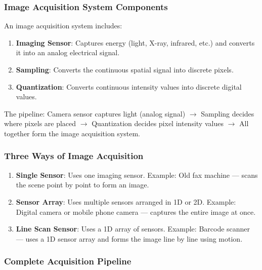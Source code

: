 \documentclass[11pt,a4paper]{article}
\begin{document}
\subsubsection{Image Acquisition System Components}

An image acquisition system includes:
\begin{enumerate}
    \item \textbf{Imaging Sensor}: Captures energy (light, X-ray, infrared, etc.) and converts it into an analog electrical signal.
    \item \textbf{Sampling}: Converts the continuous spatial signal into discrete pixels.
    \item \textbf{Quantization}: Converts continuous intensity values into discrete digital values.
\end{enumerate}

The pipeline: Camera sensor captures light (analog signal) $\to$ Sampling decides where pixels are placed $\to$ Quantization decides pixel intensity values $\to$ All together form the image acquisition system.

\subsubsection{Three Ways of Image Acquisition}

\begin{enumerate}
    \item \textbf{Single Sensor}: Uses one imaging sensor. Example: Old fax machine --- scans the scene point by point to form an image.
    \item \textbf{Sensor Array}: Uses multiple sensors arranged in 1D or 2D. Example: Digital camera or mobile phone camera --- captures the entire image at once.
    \item \textbf{Line Scan Sensor}: Uses a 1D array of sensors. Example: Barcode scanner --- uses a 1D sensor array and forms the image line by line using motion.
\end{enumerate}

\subsubsection{Complete Acquisition Pipeline}
\end{document}
